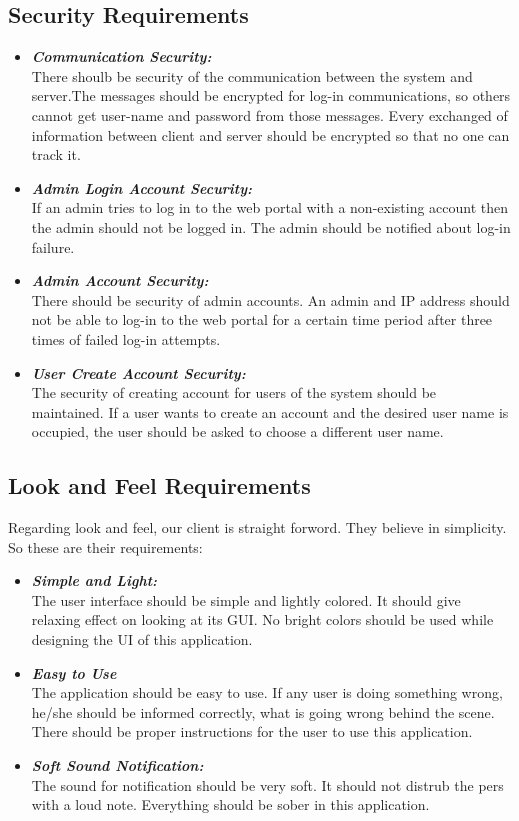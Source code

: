 \subsection{Security Requirements}
\begin{itemize}
\item \textbf{\emph{Communication Security:}}\\
There shoulb be security of the communication between the system and server.The messages should be
 encrypted for log-in communications, so others cannot get user-name and password from those messages.
Every exchanged of information between client and server should be encrypted so that no one can track it.
\item \textbf{\emph{Admin Login Account Security:}}\\
If an admin tries to log in to the web portal with a non-existing account then the admin should
not be logged in. The admin should be notified about log-in failure.
\item \textbf{\emph{Admin Account Security:}}\\
There should be security of admin accounts. An admin and IP address should not be able to log-in to the web portal for a certain time period
after three times of failed log-in attempts.

\item \textbf{\emph{User Create Account Security:}}\\
The security of creating account for users of the system should be maintained. If a user wants to
 create an account and the desired user name is occupied, the user should be asked to choose a different user name.
\end{itemize}
\subsection{Look and Feel Requirements}

Regarding look and feel, our client is straight forword. They believe in simplicity. So these are their requirements:
\begin{itemize}
\item \textbf{\emph{Simple and Light:}}\\
The user interface should be simple and lightly colored. It should give relaxing effect on looking at its GUI. No bright
colors should be used while designing the UI of this application.

\item \textbf{\emph{Easy to Use}}\\
The application should be easy to use. If any user is doing something wrong, he/she should be informed correctly, what is going
wrong behind the scene. There should be proper instructions for the user to use this application.

\item \textbf{\emph{Soft Sound Notification:}}\\
The sound for notification should be very soft. It should not distrub the pers with a loud note.
Everything should be sober in this application.
\end{itemize}

